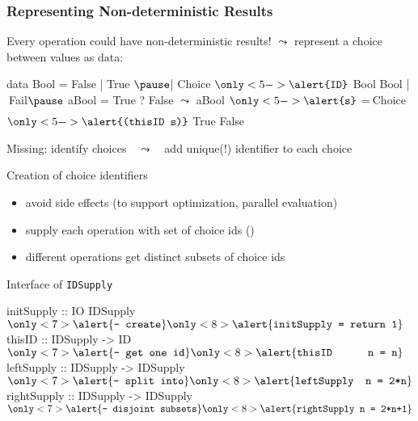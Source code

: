 \documentclass[10pt]{beamer}
\newcommand{\listline}{\vrule width0pt depth1.75ex}
\begin{document}
\begin{frame}[fragile]
\frametitle{Representing Non-deterministic Results}

\begin{block}{Every operation could have non-deterministic results!}
$\leadsto$ represent a choice between values as data:
\begin{curry}
data Bool = False | True $\pause$| Choice $\only<5->{\texttt{\alert{ID}}}$ Bool Bool | $~$Fail$\listline\pause$
aBool = True ? False $\leadsto$  aBool $\only<5->{\texttt{\alert{s}}}$ =$~$Choice $\only<5->{\texttt{\alert{(thisID s)}}}$ True False
\end{curry}
\pause
Missing: \alert{identify choices}\pause~~$\leadsto$~~add unique(!) identifier to each choice
\end{block}
\pause
\vfill
\begin{block}{Creation of choice identifiers}
\begin{itemize}
\item avoid side effects (to support optimization, parallel evaluation)
\item supply each operation with \alert{set of choice ids} ()
\item different operations get distinct subsets of choice ids
\end{itemize}
\end{block}
\vfill\pause

\begin{exampleblock}{Interface of {\tt IDSupply}}
\vspace{-1ex}
\begin{curry}
initSupply  :: IO IDSupply            $\only<7>{\alert{\mbox{\tt{-- create}}}}\only<8>{\alert{\mbox{\tt{initSupply = return 1}}}}$
thisID      :: IDSupply -> ID        $\only<7>{\alert{\mbox{\tt{-- get one id}}}}\only<8>{\alert{\mbox{\tt{thisID~~~~~ n = n}}}}$
leftSupply  :: IDSupply -> IDSupply  $\only<7>{\alert{\mbox{\tt{-- split into}}}}\only<8>{\alert{\mbox{\tt{leftSupply~ n = 2*n}}}}$
rightSupply :: IDSupply -> IDSupply  $\only<7>{\alert{\mbox{\tt{-- disjoint subsets}}}}\only<8>{\alert{\mbox{\tt{rightSupply n = 2*n+1}}}}$
\end{curry}
\end{exampleblock}

\end{frame}
\end{document}
